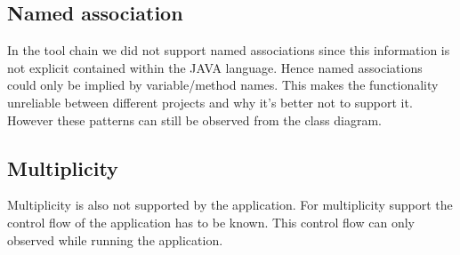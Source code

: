 \subsection*{Named association}
In the tool chain we did not support named associations since this information is not explicit contained within the JAVA language. Hence named associations could only be implied by variable/method names. This makes the functionality unreliable between different projects and why it's better not to support it. However these patterns can still be observed from the class diagram.

\subsection*{Multiplicity}
Multiplicity is also not supported by the application. For multiplicity support the control flow of the application has to be known. This control flow can only observed while running the application.

